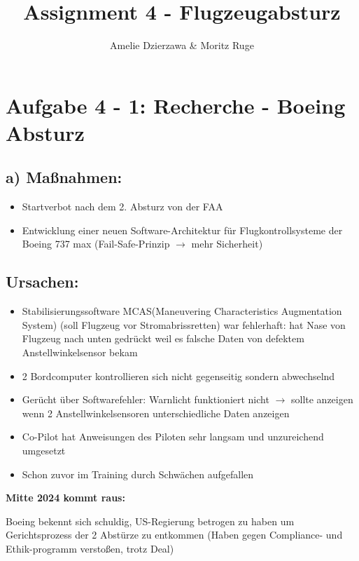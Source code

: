 \documentclass[11pt,a4paper]{article}
\author{Amelie Dzierzawa \& Moritz Ruge}
\title{Assignment 4 - Flugzeugabsturz}
\begin{document}
\maketitle
\newpage

\section*{Aufgabe 4 - 1: Recherche - Boeing Absturz}
\subsection*{a) Maßnahmen:}

\begin{center}
\begin{itemize}
\item Startverbot nach dem 2. Absturz von der FAA
\item Entwicklung einer neuen Software-Architektur für Flugkontrollsysteme der Boeing 737 max (Fail-Safe-Prinzip $\longrightarrow$  mehr Sicherheit)
\end{itemize}
\end{center}

\subsection*{Ursachen:}
\begin{itemize}
\item Stabilisierungssoftware MCAS(Maneuvering Characteristics Augmentation System) (soll Flugzeug vor Stromabrissretten) war fehlerhaft: hat Nase von Flugzeug nach unten gedrückt weil es falsche Daten von defektem Anstellwinkelsensor bekam
\item 2 Bordcomputer kontrollieren sich nicht gegenseitig sondern abwechselnd
\item Gerücht über Softwarefehler: Warnlicht funktioniert nicht $\longrightarrow$ sollte anzeigen wenn 2 Anstellwinkelsensoren unterschiedliche Daten anzeigen
\item Co-Pilot hat Anweisungen des Piloten sehr langsam und unzureichend umgesetzt
\item Schon zuvor im Training durch Schwächen aufgefallen
\end{itemize}

\textbf{Mitte 2024 kommt raus: }

\begin{flushleft}
Boeing bekennt sich schuldig, US-Regierung betrogen zu haben um Gerichtsprozess der 2 Abstürze zu entkommen (Haben gegen Compliance- und Ethik-programm verstoßen, trotz Deal)
\end{flushleft}
\end{document}
